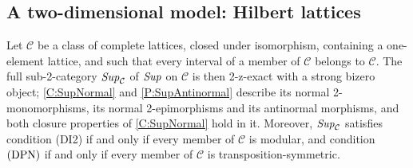 \subsection{A two-dimensional model: Hilbert lattices}\label{SS:NSDHilbert}

\begin{proposition}
  \label{P:SupClass}   \leanok
  Let \(\mathcal{C}\) be a class of complete lattices, closed under isomorphism, containing a one-element lattice, and such that every interval of a member of \(\mathcal{C}\) belongs to \(\mathcal{C}\). The full sub-2-category \(\mathit{Sup}_{\mathcal{C}}\) of \(\mathit{Sup}\) on \(\mathcal{C}\) is then 2-z-exact with a strong bizero object; \corx\ref{C:SupNormal} and \prox\ref{P:SupAntinormal} describe its normal 2-monomorphisms, its normal 2-epimorphisms and its antinormal morphisms, and both closure properties of \corx\ref{C:SupNormal} hold in it. Moreover, \(\mathit{Sup}_{\mathcal{C}}\) satisfies condition \textup{(DI2)} if and only if every member of \(\mathcal{C}\) is modular, and condition \(\textup{(DPN)}\) if and only if every member of \(\mathcal{C}\) is transposition-symmetric.
\end{proposition}

